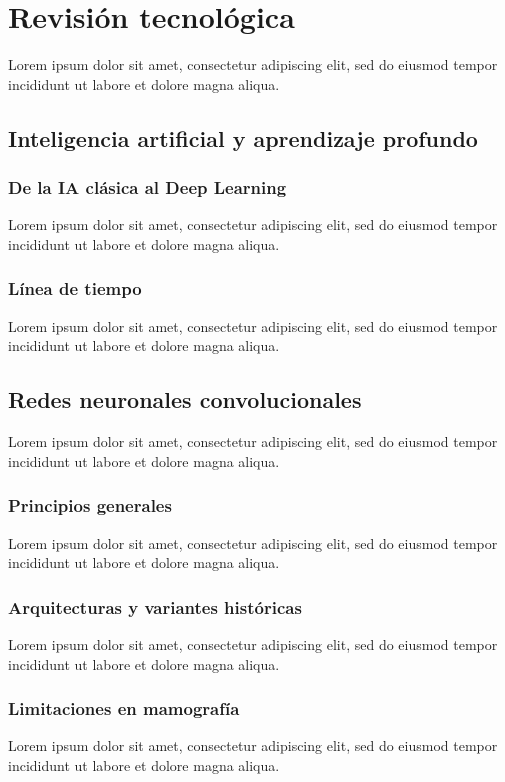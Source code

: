 \documentclass[a4paper,10pt]{book}
\begin{document}
\chapter{Revisión tecnológica}

Lorem ipsum dolor sit amet, consectetur adipiscing elit, sed do eiusmod tempor incididunt ut labore et dolore magna aliqua.


\section{Inteligencia artificial y aprendizaje profundo}
\subsection{De la IA clásica al Deep Learning}
Lorem ipsum dolor sit amet, consectetur adipiscing elit, sed do eiusmod tempor incididunt ut labore et dolore magna aliqua.
\subsection{Línea de tiempo}
Lorem ipsum dolor sit amet, consectetur adipiscing elit, sed do eiusmod tempor incididunt ut labore et dolore magna aliqua.

\section{Redes neuronales convolucionales}
Lorem ipsum dolor sit amet, consectetur adipiscing elit, sed do eiusmod tempor incididunt ut labore et dolore magna aliqua.
\subsection{Principios generales}
Lorem ipsum dolor sit amet, consectetur adipiscing elit, sed do eiusmod tempor incididunt ut labore et dolore magna aliqua.
\subsection{Arquitecturas y variantes históricas}
Lorem ipsum dolor sit amet, consectetur adipiscing elit, sed do eiusmod tempor incididunt ut labore et dolore magna aliqua.
\subsection{Limitaciones en mamografía}
Lorem ipsum dolor sit amet, consectetur adipiscing elit, sed do eiusmod tempor incididunt ut labore et dolore magna aliqua.
\end{document}
